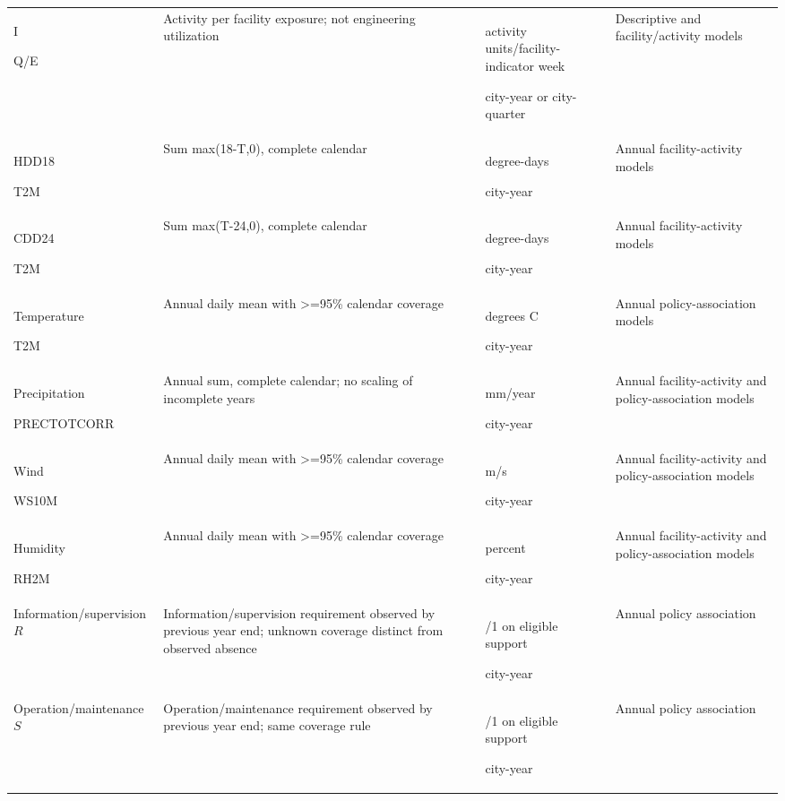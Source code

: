 \begin{longtable}{@{}>{\raggedright\arraybackslash}p{30mm}>{\raggedright\arraybackslash}p{48mm}>{\raggedright\arraybackslash}p{30mm}>{\raggedright\arraybackslash}p{44mm}@{}}
I\par Q/\allowbreak{}E & Activity per facility exposure; not engineering utilization & activity units/\allowbreak{}facility-indicator week\par city-year or city-quarter & Descriptive and facility/\allowbreak{}activity models\\[3pt]
HDD18\par T2M & Sum max(18-T,0), complete calendar & degree-days\par city-year & Annual facility-activity models\\[3pt]
CDD24\par T2M & Sum max(T-24,0), complete calendar & degree-days\par city-year & Annual facility-activity models\\[3pt]
Temperature\par T2M & Annual daily mean with >=95\% calendar coverage & degrees C\par city-year & Annual policy-association models\\[3pt]
Precipitation\par PRECTOTCORR & Annual sum, complete calendar; no scaling of incomplete years & mm/\allowbreak{}year\par city-year & Annual facility-activity and policy-association models\\[3pt]
Wind\par WS10M & Annual daily mean with >=95\% calendar coverage & m/\allowbreak{}s\par city-year & Annual facility-activity and policy-association models\\[3pt]
Humidity\par RH2M & Annual daily mean with >=95\% calendar coverage & percent\par city-year & Annual facility-activity and policy-association models\\[3pt]
Information/\allowbreak{}supervision $R$ & Information/\allowbreak{}supervision requirement observed by previous year end; unknown coverage distinct from observed absence & 0/\allowbreak{}1 on eligible support\par city-year & Annual policy association\\[3pt]
Operation/\allowbreak{}maintenance $S$ & Operation/\allowbreak{}maintenance requirement observed by previous year end; same coverage rule & 0/\allowbreak{}1 on eligible support\par city-year & Annual policy association\\[3pt]

\end{longtable}
